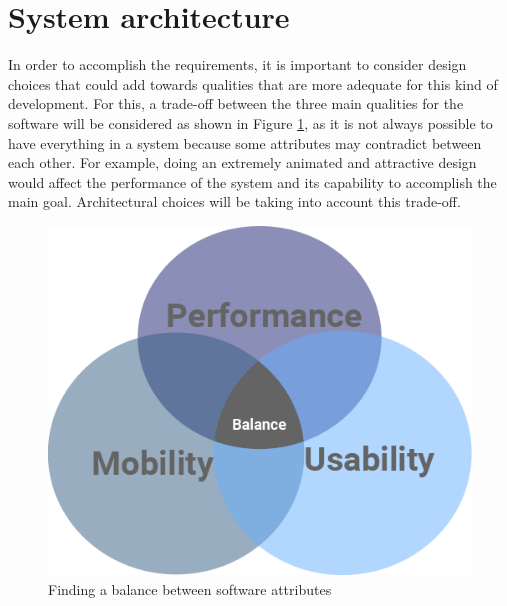 \section{System architecture}
In order to accomplish the requirements, it is important to consider design choices that could add towards qualities that are more adequate for this kind of development. For this, a trade-off between the three main qualities for the software will be considered as shown in Figure \ref{fig:balance_attributes}, as it is not always possible to have everything in a system because some attributes may contradict between each other. For example, doing an extremely animated and attractive design would affect the performance of the system and its capability to accomplish the main goal. Architectural choices will be taking into account this trade-off.


\begin{figure}[H]
\begin{adjustbox}{width=.5\textwidth,center=\textwidth}
  \centering
  \includegraphics[scale=1]{images/balanceCircles.png}
\end{adjustbox}
  \caption[Finding a balance between software attributes]{Finding a balance between software attributes}
  \label{fig:balance_attributes}
\end{figure}

